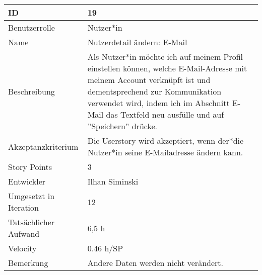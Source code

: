 \begin{tabularx}{\textwidth}{|p{}|X|}
	\hline
	ID & 19\\
	\hline
	Benutzerrolle & Nutzer*in\\
	\hline
	Name & Nutzerdetail ändern: E-Mail\\
	\hline
	Beschreibung & Als Nutzer*in möchte ich auf meinem Profil einstellen können, welche E-Mail-Adresse mit meinem Account verknüpft ist und dementsprechend zur Kommunikation verwendet wird, indem ich im Abschnitt E-Mail das Textfeld neu ausfülle und auf ''Speichern'' drücke.\\
	\hline
	Akzeptanzkriterium & Die Userstory wird akzeptiert, wenn der*die Nutzer*in seine E-Mailadresse ändern kann.\\
	\hline
	Story Points & 3\\
	\hline
	Entwickler & Ilhan Siminski\\
	\hline
	Umgesetzt in Iteration & 12\\
	\hline
	Tatsächlicher Aufwand & 6,5 h\\
	\hline
	Velocity & 0.46 h/SP\\
	\hline
	Bemerkung & Andere Daten werden nicht verändert.\\
	\hline
\end{tabularx}
\vspace{20pt}
